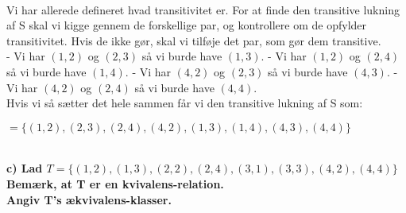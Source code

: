 \\
Vi har allerede defineret hvad transitivitet er. For at finde den transitive lukning af S skal vi kigge gennem de forskellige par, og kontrollere om de opfylder transitivitet. Hvis de ikke gør, skal vi tilføje det par, som gør dem transitive.
\\
- Vi har \((1, 2)\) og \((2, 3)\) så vi burde have \((1, 3)\).
- Vi har \((1, 2)\) og \((2, 4)\) så vi burde have \((1, 4)\).
- Vi har \((4, 2)\) og \((2, 3)\) så vi burde have \((4, 3)\).
- Vi har \((4, 2)\) og \((2, 4)\) så vi burde have \((4, 4)\).
\\
Hvis vi så sætter det hele sammen får vi den transitive lukning af S som: \\
\begin{center}
\(= \{(1, 2), (2, 3), (2, 4), (4, 2), (1, 3), (1, 4), (4, 3), (4, 4)\}\)
\end{center}
\\
\textbf{c) Lad \(T = \{(1, 2), (1, 3), (2, 2), (2, 4), (3, 1), (3, 3), (4, 2), (4, 4)\}\)\\
Bemærk, at T er en kvivalens-relation.\\
Angiv T's ækvivalens-klasser.\\}
\\

